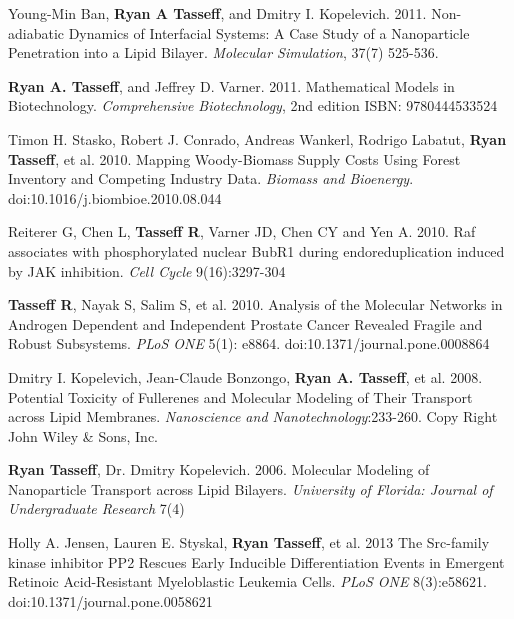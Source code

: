 \documentclass[margin,line]{res}
\begin{document}
\begin{resume}
Young-Min Ban, {\bf Ryan A Tasseff}, and Dmitry I. Kopelevich. 2011.
Non-adiabatic Dynamics of Interfacial Systems: A Case Study of a Nanoparticle Penetration into a Lipid Bilayer.
{\it Molecular Simulation}, 37(7) 525-536. 

{\bf Ryan A. Tasseff}, and Jeffrey D. Varner. 2011.
Mathematical Models in Biotechnology.
{\it Comprehensive Biotechnology}, 2nd edition ISBN: 9780444533524

Timon H. Stasko, Robert J. Conrado, Andreas Wankerl, Rodrigo Labatut, {\bf Ryan Tasseff}, et al. 2010. 
Mapping Woody-Biomass Supply Costs Using Forest Inventory and Competing Industry Data. 
{\it Biomass and Bioenergy}.  doi:10.1016/j.biombioe.2010.08.044

Reiterer G, Chen L, {\bf Tasseff R}, Varner JD, Chen CY and Yen A. 2010.
Raf associates with phosphorylated nuclear BubR1 during endoreduplication 
induced by JAK inhibition.  
{\it Cell Cycle} 9(16):3297-304

{\bf Tasseff R}, Nayak S, Salim S, et al. 2010. 
Analysis of the Molecular Networks in Androgen Dependent and 
Independent Prostate Cancer Revealed Fragile and Robust Subsystems. 
{\it PLoS ONE} 5(1): e8864. doi:10.1371/journal.pone.0008864

Dmitry I. Kopelevich, Jean-Claude Bonzongo, {\bf Ryan A. Tasseff}, et al.
2008. Potential Toxicity of Fullerenes and Molecular Modeling of Their 
Transport across Lipid Membranes. 
{\it Nanoscience and Nanotechnology}:233-260. 
Copy Right John Wiley \& Sons, Inc.

{\bf Ryan Tasseff}, Dr. Dmitry Kopelevich. 2006. Molecular Modeling of Nanoparticle Transport 
across Lipid Bilayers.
{\it University of Florida: Journal of Undergraduate Research} 7(4)

Holly A. Jensen, Lauren E. Styskal, {\bf Ryan Tasseff}, et al.
2013 The Src-family kinase inhibitor PP2 Rescues Early Inducible Differentiation 
Events in Emergent Retinoic Acid-Resistant Myeloblastic Leukemia Cells.
{\it PLoS ONE} 8(3):e58621. doi:10.1371/journal.pone.0058621 






\end{resume}
\end{document}
